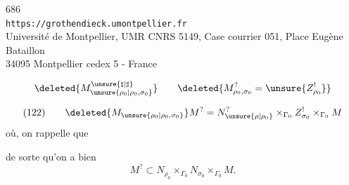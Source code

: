 
\begin{center}
686\\
\texttt{https://grothendieck.umontpellier.fr}\\
Université de Montpellier, UMR CNRS 5149, Case courrier 051, Place Eugène Bataillon\\
34095 Montpellier cedex 5 - France
\end{center}



\[
\deleted{M_{\unsure{\rho_0|\rho_0,\sigma_0}}^{\unsure{\natural|\sharp}}}
\qquad
\deleted{M_{\rho_0,\sigma_0}^{?}=\unsure{Z_{\rho_0}^{!}}}
\]

\[
(122)\qquad
\deleted{M_{\unsure{\rho_0|\rho_0,\sigma_0}}}
M^?=N_{\unsure{\rho|\rho_0}}^?
\times_{\Gamma_0}Z_{\sigma_0}^!\times_{\Gamma_0}M
\]
où, on rappelle que


de sorte qu'on a bien
\[
M^?\subset N_{\rho_0}\times_{\Gamma_0}N_{\sigma_0}
\times_{\Gamma_0}M .
\]

